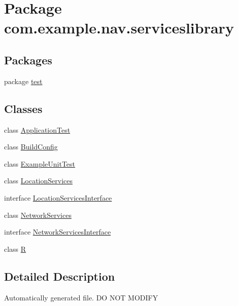 \hypertarget{namespacecom_1_1example_1_1nav_1_1serviceslibrary}{}\section{Package com.\+example.\+nav.\+serviceslibrary}
\label{namespacecom_1_1example_1_1nav_1_1serviceslibrary}
\subsection*{Packages}
\begin{DoxyCompactItemize}
\item 
package \hyperlink{namespacecom_1_1example_1_1nav_1_1serviceslibrary_1_1test}{test}
\end{DoxyCompactItemize}
\subsection*{Classes}
\begin{DoxyCompactItemize}
\item 
class \hyperlink{classcom_1_1example_1_1nav_1_1serviceslibrary_1_1_application_test}{Application\+Test}
\item 
class \hyperlink{classcom_1_1example_1_1nav_1_1serviceslibrary_1_1_build_config}{Build\+Config}
\item 
class \hyperlink{classcom_1_1example_1_1nav_1_1serviceslibrary_1_1_example_unit_test}{Example\+Unit\+Test}
\item 
class \hyperlink{classcom_1_1example_1_1nav_1_1serviceslibrary_1_1_location_services}{Location\+Services}
\item 
interface \hyperlink{interfacecom_1_1example_1_1nav_1_1serviceslibrary_1_1_location_services_interface}{Location\+Services\+Interface}
\item 
class \hyperlink{classcom_1_1example_1_1nav_1_1serviceslibrary_1_1_network_services}{Network\+Services}
\item 
interface \hyperlink{interfacecom_1_1example_1_1nav_1_1serviceslibrary_1_1_network_services_interface}{Network\+Services\+Interface}
\item 
class \hyperlink{classcom_1_1example_1_1nav_1_1serviceslibrary_1_1_r}{R}
\end{DoxyCompactItemize}


\subsection{Detailed Description}
Automatically generated file. DO N\+OT M\+O\+D\+I\+FY 